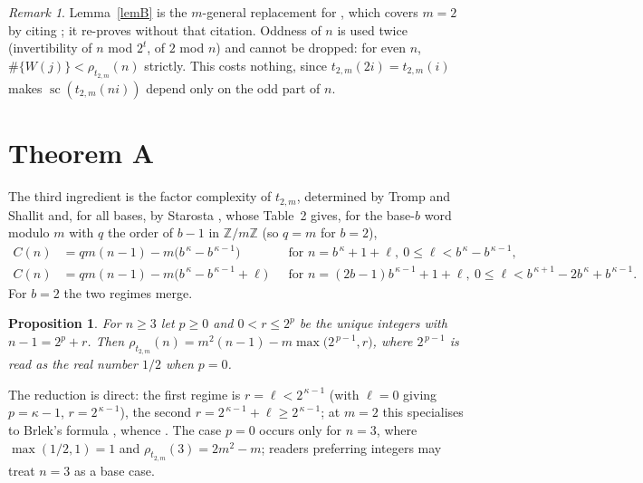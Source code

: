 \documentclass[10pt,reqno]{amsart}
\theoremstyle{plain}
\newtheorem{proposition}[theorem]{Proposition}
\theoremstyle{definition}
\theoremstyle{remark}
\newtheorem{remark}[theorem]{Remark}
\numberwithin{theorem}{section}
\DeclareMathOperator{\sco}{sc}
\newcommand{\Zm}{\mathbb{Z}/m\mathbb{Z}}
\newcommand{\tm}{t_{2,m}}
\begin{document}
\begin{remark}
Lemma~\ref{lemB} is the $m$-general replacement for \cite[Lemma~15]{MRS}, which covers
$m = 2$ by citing \cite{BSCRF}; it re-proves \cite[Thm.~14]{MRS} without that citation.
Oddness of $n$ is used twice (invertibility of $n$ mod $2^t$, of $2$ mod $n$) and cannot be
dropped: for even $n$, $\#\{W(j)\} < \rho_{\tm}(n)$ strictly. This costs nothing, since
$\tm(2i) = \tm(i)$ makes $\sco(\tm(ni))$ depend only on the odd part of $n$.
\end{remark}

\section{Theorem A}
\label{sec:thmA}

The third ingredient is the factor complexity of $\tm$, determined by Tromp and Shallit
\cite{TrompShallit} and, for all bases, by Starosta \cite{Starosta}, whose Table~2 gives,
for the base-$b$ word modulo $m$ with $q$ the order of $b-1$ in $\Zm$ (so $q = m$ for
$b = 2$),
\begin{align*}
  C(n) &= qm(n-1) - m\bigl(b^{\,\kappa} - b^{\,\kappa-1}\bigr)
   && \text{for } n = b^{\,\kappa} + 1 + \ell,\ 0 \le \ell < b^{\,\kappa}-b^{\,\kappa-1},\\
  C(n) &= qm(n-1) - m\bigl(b^{\,\kappa} - b^{\,\kappa-1} + \ell\bigr)
   && \text{for } n = (2b{-}1)b^{\,\kappa-1} + 1 + \ell,\ 0 \le \ell < b^{\,\kappa+1}-2b^{\,\kappa}+b^{\,\kappa-1}.
\end{align*}
For $b = 2$ the two regimes merge.

\begin{proposition}
\label{prop:rho}
For $n \ge 3$ let $p \ge 0$ and $0 < r \le 2^p$ be the unique integers with
$n - 1 = 2^p + r$. Then $\rho_{\tm}(n) = m^2(n-1) - m\max\bigl(2^{\,p-1}, r\bigr)$,
where $2^{\,p-1}$ is read as the real number $1/2$ when $p = 0$.
\end{proposition}

The reduction is direct: the first regime is $r = \ell < 2^{\,\kappa-1}$ (with $\ell = 0$
giving $p = \kappa-1$, $r = 2^{\,\kappa-1}$), the second $r = 2^{\,\kappa-1} + \ell \ge
2^{\,\kappa-1}$; at $m = 2$ this specialises to Brlek's formula \cite{Brlek}, whence
\cite[Cor.~17]{MRS}. The case $p = 0$ occurs only for $n = 3$, where $\max(1/2,1) = 1$ and
$\rho_{\tm}(3) = 2m^2 - m$; readers preferring integers may treat $n = 3$ as a base case.
\end{document}
